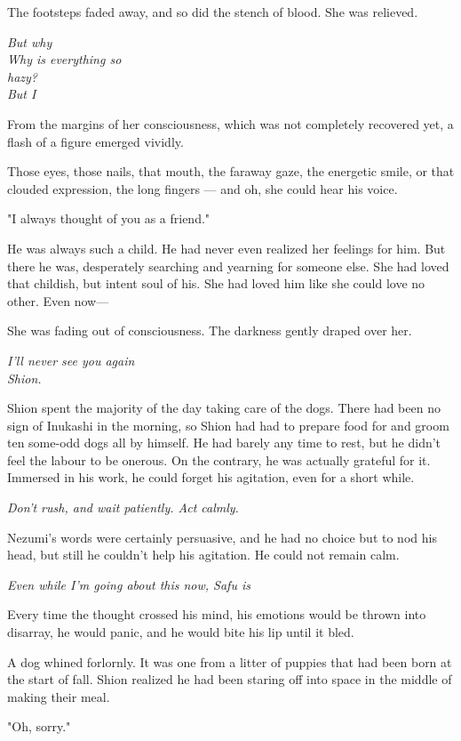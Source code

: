 The footsteps faded away, and so did the stench of blood. She was
relieved.

\emph{But why\\
	Why is everything so\\
	hazy?\\
	But I}

From the margins of her consciousness, which was not completely
recovered yet, a flash of a figure emerged vividly.

Those eyes, those nails, that mouth, the faraway gaze, the energetic
smile, or that clouded expression, the long fingers --- and oh, she could
hear his voice.

"I always thought of you as a friend."

He was always such a child. He had never even realized her feelings for
him. But there he was, desperately searching and yearning for someone
else. She had loved that childish, but intent soul of his. She had loved
him like she could love no other. Even now---

She was fading out of consciousness. The darkness gently draped over
her.

\emph{I'll never see you again\el \\
	Shion.}

\mybreak

Shion spent the majority of the day taking care of the dogs. There had
been no sign of Inukashi in the morning, so Shion had had to prepare
food for and groom ten some-odd dogs all by himself. He had barely any
time to rest, but he didn't feel the labour to be onerous. On the
contrary, he was actually grateful for it. Immersed in his work, he
could forget his agitation, even for a short while.

\emph{Don't rush, and wait patiently. Act calmly.}

Nezumi's words were certainly persuasive, and he had no choice but to
nod his head, but still he couldn't help his agitation. He could not
remain calm.

\emph{Even while I'm going about this now, Safu is\el }

Every time the thought crossed his mind, his emotions would be thrown
into disarray, he would panic, and he would bite his lip until it bled.

A dog whined forlornly. It was one from a litter of puppies that had
been born at the start of fall. Shion realized he had been staring off
into space in the middle of making their meal.

"Oh, sorry."


